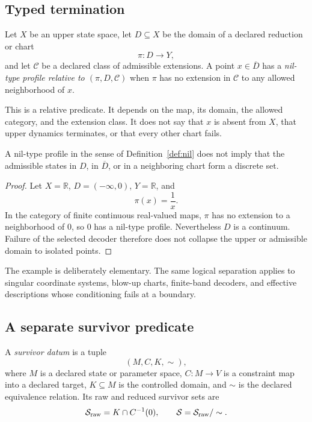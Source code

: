 \documentclass[11pt]{article}
\newcommand{\Surv}{\mathcal S}
\begin{document}
\subsection{Typed termination}

\begin{definition}\label{def:nil}
Let $X$ be an upper state space, let $D\subseteq X$ be the domain of a declared
reduction or chart
\[
 \pi:D\longrightarrow Y,
\]
and let $\mathcal C$ be a declared class of admissible extensions.  A point
$x\in\overline D$ has a \emph{nil-type profile relative to
$(\pi,D,\mathcal C)$} when $\pi$ has no extension in $\mathcal C$ to any
allowed neighborhood of $x$.
\end{definition}

This is a relative predicate.  It depends on the map, its domain, the allowed
category, and the extension class.  It does not say that $x$ is absent from
$X$, that upper dynamics terminates, or that every other chart fails.

\begin{proposition}
\label{prop:nil-not-discrete}
A nil-type profile in the sense of Definition~\ref{def:nil} does not imply
that the admissible states in $D$, in $\overline D$, or in a neighboring chart
form a discrete set.
\end{proposition}

\begin{proof}
Let $X=\mathbb R$, $D=(-\infty,0)$, $Y=\mathbb R$, and
\[
 \pi(x)=\frac{1}{x}.
\]
In the category of finite continuous real-valued maps, $\pi$ has no extension
to a neighborhood of $0$, so $0$ has a nil-type profile.  Nevertheless $D$ is
a continuum.  Failure of the selected decoder therefore does not collapse
the upper or admissible domain to isolated points.
\end{proof}

\begin{remark}
The example is deliberately elementary.  The same logical separation applies
to singular coordinate systems, blow-up charts, finite-band decoders, and
effective descriptions whose conditioning fails at a boundary.
\end{remark}

\subsection{A separate survivor predicate}

\begin{definition}\label{def:survivor}
A \emph{survivor datum} is a tuple
\[
 (M,C,K,\sim),
\]
where $M$ is a declared state or parameter space, $C:M\to V$ is a constraint
map into a declared target, $K\subseteq M$ is the controlled domain, and
$\sim$ is the declared equivalence relation.  Its raw and reduced survivor
sets are
\[
 \Surv_{\rm raw}=K\cap C^{-1}(0),
 \qquad
 \Surv=\Surv_{\rm raw}/\sim.
\]
\end{definition}
\end{document}
